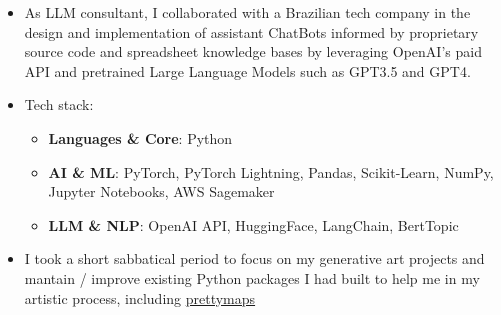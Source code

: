 {  
  \begin{itemize}
    \item As LLM consultant, I collaborated with a Brazilian tech company in the design and implementation of assistant ChatBots informed by proprietary source code and spreadsheet knowledge bases by leveraging OpenAI's paid API and pretrained Large Language Models such as GPT3.5 and GPT4.
    \item Tech stack:
      \begin{itemize}
        \item \textbf{Languages \& Core}: {\color{accent2}Python}
        \item \textbf{AI \& ML}: {\color{accent2}PyTorch, PyTorch Lightning, Pandas, Scikit-Learn, NumPy, Jupyter Notebooks, AWS Sagemaker}
        \item \textbf{LLM \& NLP}: {\color{accent2}OpenAI API, HuggingFace, LangChain, BertTopic}
      \end{itemize}
  \end{itemize}

  \begin{itemize}
    \item I took a short sabbatical period to focus on my generative art projects and mantain / improve existing Python packages I had built to help me in my artistic process, including \href{https://github.com/marcelopprates/prettymaps}{prettymaps}
  \end{itemize}

  \divider

}

